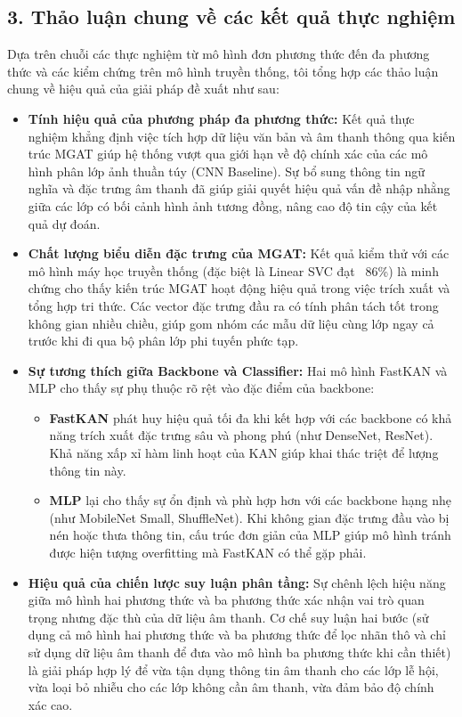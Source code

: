\subsection{3. Thảo luận chung về các kết quả thực nghiệm}
\indent\indent Dựa trên chuỗi các thực nghiệm từ mô hình đơn phương thức đến đa phương thức và các kiểm chứng trên mô hình truyền thống, tôi tổng hợp các thảo luận chung về hiệu quả của giải pháp đề xuất như sau:
\begin{itemize}[label={--}, itemsep=1pt]
    \item \textbf{Tính hiệu quả của phương pháp đa phương thức:} Kết quả thực nghiệm khẳng định việc tích hợp dữ liệu văn bản và âm thanh thông qua kiến trúc MGAT giúp hệ thống vượt qua giới hạn về độ chính xác của các mô hình phân lớp ảnh thuần túy (CNN Baseline). Sự bổ sung thông tin ngữ nghĩa và đặc trưng âm thanh đã giúp giải quyết hiệu quả vấn đề nhập nhằng giữa các lớp có bối cảnh hình ảnh tương đồng, nâng cao độ tin cậy của kết quả dự đoán.

    \item \textbf{Chất lượng biểu diễn đặc trưng của MGAT:} Kết quả kiểm thử với các mô hình máy học truyền thống (đặc biệt là Linear SVC đạt ~86\%) là minh chứng cho thấy kiến trúc MGAT hoạt động hiệu quả trong việc trích xuất và tổng hợp tri thức. Các vector đặc trưng đầu ra có tính phân tách tốt trong không gian nhiều chiều, giúp gom nhóm các mẫu dữ liệu cùng lớp ngay cả trước khi đi qua bộ phân lớp phi tuyến phức tạp.

    \item \textbf{Sự tương thích giữa Backbone và Classifier:} Hai mô hình FastKAN và MLP cho thấy sự phụ thuộc rõ rệt vào đặc điểm của backbone:
    \begin{itemize}[label={+}, itemsep=1pt]
        \item \textbf{FastKAN} phát huy hiệu quả tối đa khi kết hợp với các backbone có khả năng trích xuất đặc trưng sâu và phong phú (như DenseNet, ResNet). Khả năng xấp xỉ hàm linh hoạt của KAN giúp khai thác triệt để lượng thông tin này.
        \item \textbf{MLP} lại cho thấy sự ổn định và phù hợp hơn với các backbone hạng nhẹ (như MobileNet Small, ShuffleNet). Khi không gian đặc trưng đầu vào bị nén hoặc thưa thông tin, cấu trúc đơn giản của MLP giúp mô hình tránh được hiện tượng overfitting mà FastKAN có thể gặp phải.
    \end{itemize}

    \item \textbf{Hiệu quả của chiến lược suy luận phân tầng:} Sự chênh lệch hiệu năng giữa mô hình hai phương thức và ba phương thức xác nhận vai trò quan trọng nhưng đặc thù của dữ liệu âm thanh. Cơ chế suy luận hai bước (sử dụng cả mô hình hai phương thức và ba phương thức để lọc nhãn thô và chỉ sử dụng dữ liệu âm thanh để đưa vào mô hình ba phương thức khi cần thiết) là giải pháp hợp lý để vừa tận dụng thông tin âm thanh cho các lớp lễ hội, vừa loại bỏ nhiễu cho các lớp không cần âm thanh, vừa đảm bảo độ chính xác cao.
\end{itemize}

